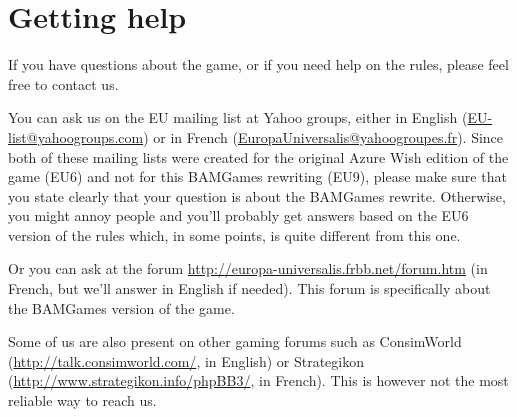\section*{Getting help}
If you have questions about the game, or if you need help on the rules, please
feel free to contact us. 

You can ask us on the EU mailing list at Yahoo groups, either in English
(\url{EU-list@yahoogroups.com}) or in French
(\url{EuropaUniversalis@yahoogroupes.fr}). Since both of these mailing lists
were created for the original Azure Wish edition of the game (EU6) and not for
this BAMGames rewriting (EU9), please make sure that you state clearly that
your question is about the BAMGames rewrite. Otherwise, you might annoy people
and you'll probably get answers based on the EU6 version of the rules which,
in some points, is quite different from this one.

Or you can ask at the forum \url{http://europa-universalis.frbb.net/forum.htm}
(in French, but we'll answer in English if needed). This forum is specifically
about the BAMGames version of the game.

Some of us are also present on other gaming forums such as ConsimWorld
(\url{http://talk.consimworld.com/}, in English) or Strategikon
(\url{http://www.strategikon.info/phpBB3/}, in French). This is however not
the most reliable way to reach us.

